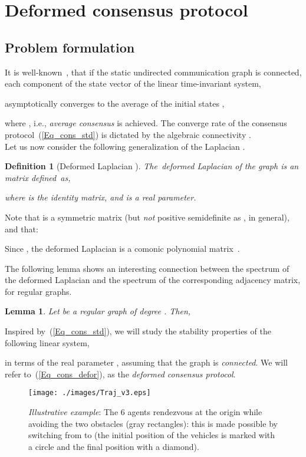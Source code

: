 \documentclass[letterpaper,9pt,twocolumn]{autart}
\newtheorem{definition}{\textbf{Definition}}
\newtheorem{lemma}{\textbf{Lemma}}
\begin{document}
\section{Deformed consensus protocol}\label{SEC:Prob}

\subsection{Problem formulation}\label{SEC:Form_Prob}

It is well-known~\cite{OlfatiSaberMu_TAC04}, that if the static undirected communication graph 
is connected, each component of the state vector 
of the linear time-invariant system,

asymptotically converges to the average of the initial states ,

where , i.e., \emph{average consensus} is achieved.
The converge rate of the consensus protocol~(\ref{Eq_cons_std}) is dictated by the algebraic
connectivity .\\
Let us now consider the following generalization of the Laplacian .
\begin{definition}[Deformed Laplacian ]
The~\emph{deformed Laplacian} of the graph  is an  matrix \mbox{defined as},

where  is the  identity matrix, and  is a real parameter.~\hfill
\end{definition} Note that  is a symmetric matrix (but \emph{not} positive
semidefinite as , in general), and that:

Since , the deformed
Laplacian is a comonic polynomial matrix~\cite[Sect.~7.2]{GohbergLaRo_Book09}. 

The following lemma shows an interesting connection between the spectrum of
the deformed Laplacian and the spectrum of the corresponding
adjacency matrix, for regular graphs.

\begin{lemma}\label{Lemma1}
Let  be a regular graph of degree . Then,

\hfill
\end{lemma}
\vspace{-0.15cm}

Inspired by~(\ref{Eq_cons_std}), we will study the
stability properties of the following linear system,

in terms of the real parameter , assuming that the graph  is \emph{connected}.
We will refer to~(\ref{Eq_cons_defor}), as the \emph{deformed consensus protocol}.
\begin{figure}[b!]
       \begin{center}
       \texttt{[image: ./images/Traj\_v3.eps]}
       \vspace{-0.15cm} 
       \caption{\emph{Illustrative example}: The 6 agents rendezvous
         at the origin while avoiding the two obstacles (gray rectangles): this
         is made possible by switching  from  to  (the
         initial position of the vehicles is marked with a circle and the final position
         with a diamond).}\label{FIG:Mov_example}
       \end{center}
\end{figure}
\end{document}
